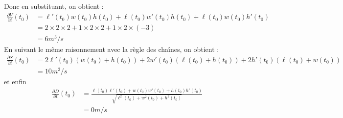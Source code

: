 {\begin{enumerate}
{		Donc en substituant, on obtient :
		\begin{align*}
		\frac{\partial V}{\partial t}(t_0) &= \ell'(t_0)w(t_0)h(t_0) + \ell(t_0)w'(t_0)h(t_0)+\ell(t_0)w(t_0)h'(t_0) \\
		&= 2 \times 2 \times 2 + 1 \times 2 \times 2 + 1 \times 2 \times (-3)\\
		&= 6m^3/s
		\end{align*}
		En suivant le même raisonnement avec la règle des chaînes, on obtient :
		\begin{align*}
		\frac{\partial S}{\partial t}(t_0) &= 2\ell'(t_0)(w(t_0)+h(t_0)) +  2w'(t_0)(\ell(t_0)+h(t_0)) + 2h'(t_0)(\ell(t_0)+w(t_0)) \\
		&= 10m^2/s
		\end{align*}
		et enfin
		\begin{align*}
		\frac{\partial D}{\partial t}(t_0) &= \frac{\ell(t_0)\ell'(t_0)+w(t_0)w'(t_0)+h(t_0)h'(t_0)}{\sqrt{\ell^2(t_0)+w^2(t_0)+h^2(t_0)}} \\
		&= 0m/s
		\end{align*}
	}
\end{enumerate}}
